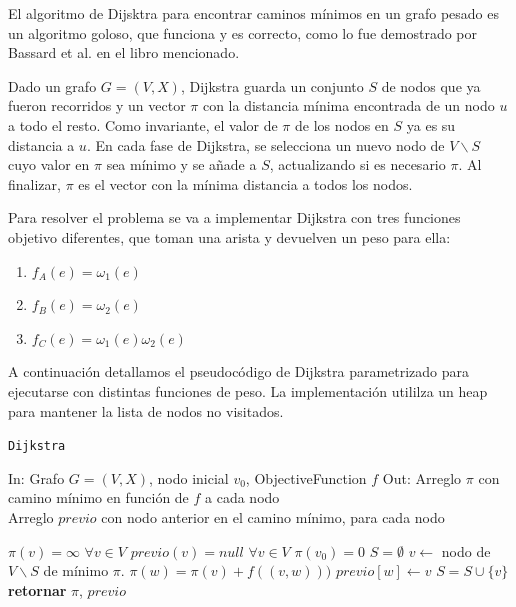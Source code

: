 El algoritmo de Dijsktra para encontrar caminos m\'inimos en un grafo pesado es un algoritmo goloso, que funciona y es correcto, como lo fue demostrado por Bassard et al. en el libro mencionado.

Dado un grafo $G=(V,X)$, Dijkstra guarda un conjunto $S$ de nodos que ya fueron recorridos y un vector $\pi$ con la distancia m\'inima encontrada de un nodo $u$ a todo el resto. Como invariante, el valor de $\pi$ de los nodos en $S$ ya es su distancia a $u$. En cada fase de Dijkstra, se selecciona un nuevo nodo de $V\backslash S$ cuyo valor en $\pi$ sea m\'inimo y se añade a $S$, actualizando si es necesario $\pi$. Al finalizar, $\pi$ es el vector con la m\'inima distancia a todos los nodos. 

Para resolver el problema se va a implementar Dijkstra con tres funciones objetivo diferentes, que toman una arista y devuelven un peso para ella: 

\begin{enumerate}
  \item $f_A(e) = \omega_1(e)$
  \item $f_B(e) = \omega_2(e)$
  \item $f_C(e) = \omega_1(e)\omega_2(e)$
\end{enumerate}

A continuación detallamos el pseudoc\'odigo de Dijkstra parametrizado para ejecutarse con distintas funciones de peso. La implementación utililza un heap para mantener la lista de nodos no visitados.

\begin{algorithm}
    \caption{\texttt{Dijkstra}}
In: Grafo $G = (V,X)$, nodo inicial $v_0$, ObjectiveFunction $f$ \newline
Out: Arreglo $\pi$ con camino m\'inimo en funci\'on de $f$ a cada nodo
\\Arreglo $previo$ con nodo anterior en el camino mínimo, para cada nodo
\begin{algorithmic}[1]
\State $\pi(v) = \infty$ \quad $\forall v \in V$
\State $previo(v) = null$ \quad $\forall v \in V$
\State $\pi(v_0) = 0$
\State $S = \emptyset$
    \State $v \leftarrow $ nodo de $V\backslash S$ de m\'inimo $\pi$. 
        \State $\pi(w) = \pi(v) + f((v,w)))$
        \State $previo[w] \leftarrow v$
      \EndIf
    \EndFor
    \State $S = S \cup \{v\}$
\EndFor
\State \textbf{retornar} $\pi$, $previo$
\end{algorithmic}
\end{algorithm}

